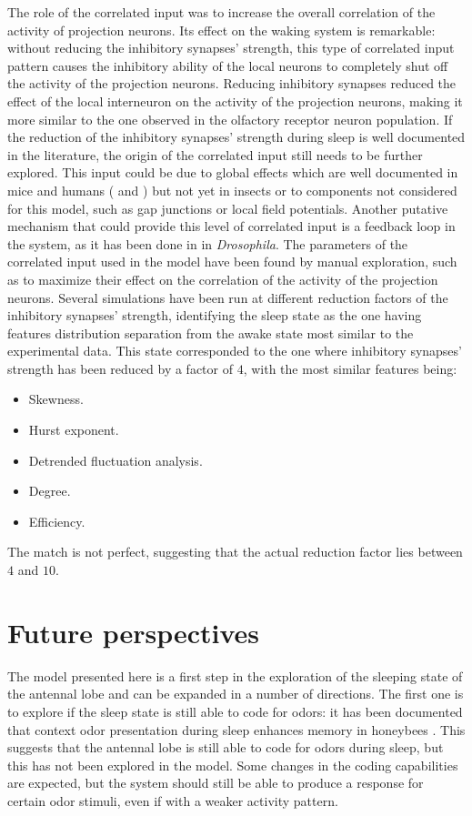 The role of the correlated input was to increase the overall correlation of the activity of projection neurons.
Its effect on the waking system is remarkable: without reducing the inhibitory synapses' strength, this type of correlated input pattern causes the inhibitory ability of the local neurons to completely shut off the activity of the projection neurons.
Reducing inhibitory synapses reduced the effect of the local interneuron on the activity of the projection neurons, making it more similar to the one observed in the olfactory receptor neuron population.
If the reduction of the inhibitory synapses' strength during sleep is well documented in the literature, the origin of the correlated input still needs to be further explored.
This input could be due to global effects which are well documented in mice and humans (\cite{sws} and \cite{synchronization-processes}) but not yet in insects or to components not considered for this model, such as gap junctions or local field potentials.
Another putative mechanism that could provide this level of correlated input is a feedback loop in the system, as it has been done in \cite{model-with-feedback} in \textit{Drosophila}.
The parameters of the correlated input used in the model have been found by manual exploration, such as to maximize their effect on the correlation of the activity of the projection neurons.
Several simulations have been run at different reduction factors of the inhibitory synapses' strength, identifying the sleep state as the one having features distribution separation from the awake state most similar to the experimental data.
This state corresponded to the one where inhibitory synapses' strength has been reduced by a factor of $4$, with the most similar features being:

\begin{itemize}
  \item Skewness.
  \item Hurst exponent.
  \item Detrended fluctuation analysis.
  \item Degree.
  \item Efficiency.
\end{itemize}

The match is not perfect, suggesting that the actual reduction factor lies between $4$ and $10$.

\section{Future perspectives}
The model presented here is a first step in the exploration of the sleeping state of the antennal lobe and can be expanded in a number of directions.
The first one is to explore if the sleep state is still able to code for odors: it has been documented that context odor presentation during sleep enhances memory in honeybees \cite{bee-odor-retention}.
This suggests that the antennal lobe is still able to code for odors during sleep, but this has not been explored in the model.
Some changes in the coding capabilities are expected, but the system should still be able to produce a response for certain odor stimuli, even if with a weaker activity pattern.\\

